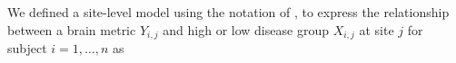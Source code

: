 We defined a site-level model using the notation of \cite{Raudenbush2000}, to express the relationship between a brain metric $Y_{i,j}$ and high or low disease group $X_{i,j}$ at site $j$ for subject $i=1,\ldots,n$ as %